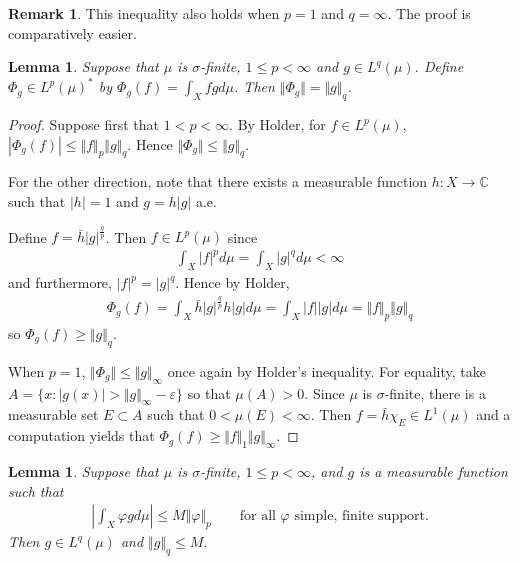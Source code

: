 \documentclass[11pt]{amsart}
\newtheorem{lemma}[theorem]{Lemma}
\theoremstyle{definition}
\newtheorem{remark}[theorem]{Remark}
\numberwithin{equation}{section}
\begin{document}
\begin{remark}
    This inequality also holds when $p=1$ and $q=\infty$. The proof is comparatively easier.
\end{remark}
\begin{lemma}
    Suppose that $\mu$ is $\sigma$-finite, $1\le p<\infty$ and $g\in L^q(\mu)$. Define $\Phi_g\in L^p(\mu)^*$ by $\Phi_g(f)=\int_Xfgd\mu$. Then $\Vert \Phi_g\Vert=\Vert g\Vert_q$.
\end{lemma}
\begin{proof}
    Suppose first that $1<p<\infty$. By Holder, for $f\in L^p(\mu)$, $|\Phi_g(f)|\le\Vert f\Vert_p\Vert g\Vert_q$. Hence $\Vert \Phi_g\Vert\le \Vert g\Vert_q$.

    For the other direction, note that there exists a measurable function $h:X\to \mathbb C$ such that $|h|=1$ and $g=h|g|$ a.e.

    Define $f=\bar h|g|^\frac{q}{p}$. Then $f\in L^p(\mu)$ since
    \begin{align*}
        \int_X|f|^pd\mu=\int_X|g|^qd\mu<\infty
    \end{align*}
    and furthermore, $|f|^p=|g|^q$. Hence by Holder,
    \begin{align*}
        \Phi_g(f)=\int_X\bar h|g|^\frac{q}{p}h|g|d\mu=\int_X|f||g|d\mu=\Vert f\Vert_p\Vert g\Vert_q
    \end{align*}
    so $\Phi_g(f)\ge \Vert g\Vert_q$.

    When $p=1$, $\Vert\Phi_g\Vert\le \Vert g\Vert_\infty$ once again by Holder's inequality. For equality, take $A=\{x:|g(x)|>\Vert g\Vert_\infty-\varepsilon\}$ so that $\mu(A)>0$. Since $\mu$ is $\sigma$-finite, there is a measurable set $E\subset A$ such that $0<\mu(E)<\infty$. Then $f=\bar h\chi_E\in L^1(\mu)$ and a computation yields that $\Phi_g(f)\ge \Vert f\Vert_1\Vert g\Vert_\infty$.
\end{proof}
\begin{lemma}
    Suppose that $\mu$ is $\sigma$-finite, $1\le p<\infty$, and $g$ is a measurable function such that 
    \begin{align*}
        \left|\int_X\varphi gd\mu\right|\le M\Vert\varphi\Vert_p\qquad\text{for all }\varphi\text{ simple, finite support.}
    \end{align*}
    Then $g\in L^q(\mu)$ and $\Vert g\Vert_q\le M$.
\end{lemma}
\end{document}

